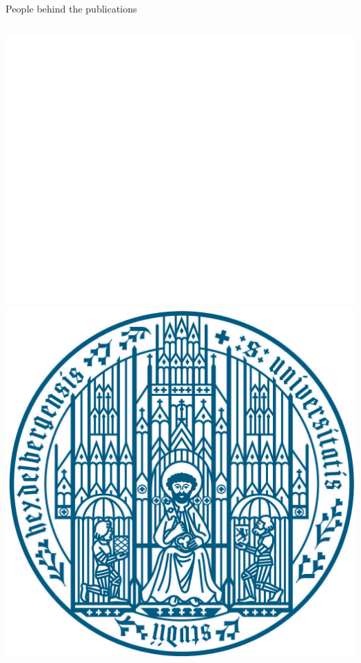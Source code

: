 \documentclass[10pt,aspectratio=169]{beamer}
\begin{document}
\begin{frame}{People behind the publications}
\begin{columns}
\begin{center}
        \includegraphics[height=\myHeight\textheight]{logos/logo_staerk.png}
        \includegraphics[height=\myHeight\textheight]{logos/uhei.png}

\end{center}
\end{columns}
\end{frame}
\end{document}
